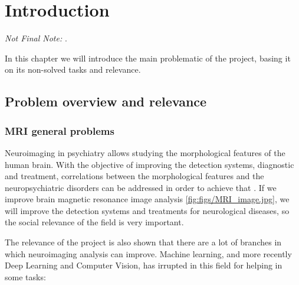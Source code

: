 \chapter{Introduction}
\label{chapter:introduccion}

\textit{Not Final Note: }.

In this chapter we will introduce the main problematic of the project, basing it on its non-solved tasks and relevance.

\section{Problem overview and relevance}

\subsection{MRI general problems}

Neuroimaging in psychiatry allows studying the morphological features of the human brain. With the objective of improving the detection systems, diagnostic and treatment, correlations between the morphological features and the neuropsychiatric disorders can be addressed in order to achieve that \cite{abou2006neuroimaging}. If we improve brain magnetic resonance image analysis \ref{fig:figs/MRI_image.jpg}, we will improve the detection systems and treatments for neurological diseases, so the social relevance of the field is very important.


The relevance of the project is also shown that there are a lot of branches in which neuroimaging analysis can improve. Machine learning, and more recently Deep Learning and Computer Vision, has irrupted in this field for helping in some tasks: 

